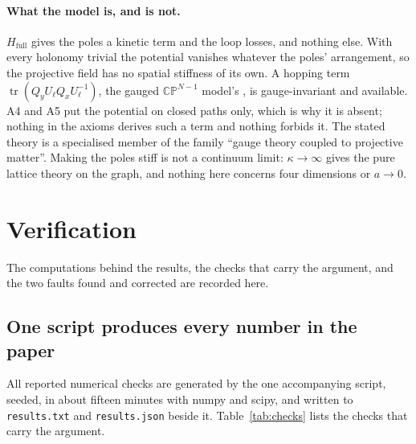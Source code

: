 \documentclass[11pt,a4paper]{article}
\theoremstyle{plain}
\theoremstyle{definition}
\theoremstyle{remark}
\newcommand{\tr}{\operatorname{tr}}
\newcommand{\CP}{\mathbb{CP}}
\begin{document}
\paragraph{What the model is, and is not.} $H_{\mathrm{full}}$ gives the poles a kinetic term and the loop losses, and nothing else. With every holonomy trivial the potential vanishes whatever the poles' arrangement, so the projective field has no spatial stiffness of its own. A hopping term $\tr(Q_yU_\ell Q_xU_\ell^{-1})$, the gauged $\CP^{N-1}$ model's \cite{cpn}, is gauge-invariant and available. A4 and A5 put the potential on closed paths only, which is why it is absent; nothing in the axioms derives such a term and nothing forbids it. The stated theory is a specialised member of the family ``gauge theory coupled to projective matter''. Making the poles stiff is not a continuum limit: $\kappa\to\infty$ gives the pure lattice theory on the graph, and nothing here concerns four dimensions or $a\to0$.

\clearpage
\section{Verification}\label{sec:verification}

The computations behind the results, the checks that carry the argument, and the two faults found and corrected are recorded here.

\subsection{One script produces every number in the paper}

All reported numerical checks are generated by the one accompanying script, seeded, in about fifteen minutes with numpy and scipy, and written to \texttt{results.txt} and \texttt{results.json} beside it. Table~\ref{tab:checks} lists the checks that carry the argument.
\end{document}
